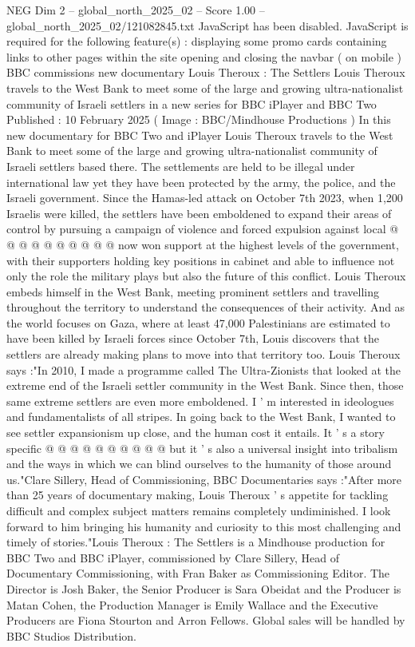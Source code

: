 \begin{textsample}{NEG Dim 2 – global\_north\_2025\_02 – Score 1.00 – global\_north\_2025\_02/121082845.txt}  \label{ex:f2_neg_010}
JavaScript has been disabled.
JavaScript is required for the following feature(s) : displaying some promo cards containing links to other pages within the site opening and closing the navbar ( on mobile ) BBC commissions new documentary Louis Theroux : The Settlers Louis Theroux travels to the West Bank to meet some of the large and growing ultra-nationalist community of Israeli settlers in a new series for BBC iPlayer and BBC Two Published : 10 February 2025 ( Image : BBC/Mindhouse Productions ) In this new documentary for BBC Two and iPlayer Louis Theroux travels to the West Bank to meet some of the large and growing ultra-nationalist community of Israeli settlers based there.
The settlements are held to be illegal under international law yet they have been protected by the army, the police, and the Israeli government.
Since the Hamas-led attack on October 7th 2023, when 1,200 Israelis were killed, the settlers have been emboldened to expand their areas of control by pursuing a campaign of violence and forced expulsion against local @ @ @ @ @ @ @ @ @ @ now won support at the highest levels of the government, with their supporters holding key positions in cabinet and able to influence not only the role the military plays but also the future of this conflict.
Louis Theroux embeds himself in the West Bank, meeting prominent settlers and travelling throughout the territory to understand the consequences of their activity.
And as the world focuses on Gaza, where at least 47,000 Palestinians are estimated to have been killed by Israeli forces since October 7th, Louis discovers that the settlers are already making plans to move into that territory too.
Louis Theroux says :"In 2010, I made a programme called The Ultra-Zionists that looked at the extreme end of the Israeli settler community in the West Bank.
Since then, those same extreme settlers are even more emboldened.
I ' m interested in ideologues and fundamentalists of all stripes.
In going back to the West Bank, I wanted to see settler expansionism up close, and the human cost it entails.
It ' s a story specific @ @ @ @ @ @ @ @ @ @ but it ' s also a universal insight into tribalism and the ways in which we can blind ourselves to the humanity of those around us."Clare Sillery, Head of Commissioning, BBC Documentaries says :"After more than 25 years of documentary making, Louis Theroux ' s appetite for tackling difficult and complex subject matters remains completely undiminished.
I look forward to him bringing his humanity and curiosity to this most challenging and timely of stories."Louis Theroux : The Settlers is a Mindhouse production for BBC Two and BBC iPlayer, commissioned by Clare Sillery, Head of Documentary Commissioning, with Fran Baker as Commissioning Editor.
The Director is Josh Baker, the Senior Producer is Sara Obeidat and the Producer is Matan Cohen, the Production Manager is Emily Wallace and the Executive Producers are Fiona Stourton and Arron Fellows.
Global sales will be handled by BBC Studios Distribution.

\end{textsample}
